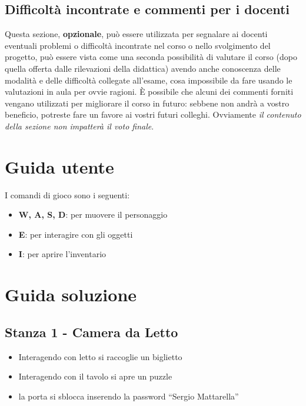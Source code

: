 \documentclass[a4paper,12pt]{report}
\begin{document}
\section{Difficoltà incontrate e commenti per i docenti}

Questa sezione, \textbf{opzionale}, può essere utilizzata per segnalare ai docenti eventuali problemi o difficoltà incontrate nel corso o nello svolgimento del progetto, può essere vista come una seconda possibilità di valutare il corso (dopo quella offerta dalle rilevazioni della didattica) avendo anche conoscenza delle modalità e delle difficoltà collegate all'esame, cosa impossibile da fare usando le valutazioni in aula per ovvie ragioni.
%
È possibile che alcuni dei commenti forniti vengano utilizzati per migliorare il corso in futuro: sebbene non andrà a vostro beneficio, potreste fare un favore ai vostri futuri colleghi.
%
Ovviamente \textit{il contenuto della sezione non impatterà il voto finale}.

\appendix
\chapter{Guida utente}

I comandi di gioco sono i seguenti:
\begin{itemize}
	\item \textbf{W, A, S, D}: per muovere il personaggio
	\item \textbf{E}: per interagire con gli oggetti
	\item \textbf{I}: per aprire l'inventario
\end{itemize}

\chapter{Guida soluzione}
%
\section{Stanza 1 - Camera da Letto}
\begin{itemize}
	\item Interagendo con letto si raccoglie un biglietto 
	\item Interagendo con il tavolo si apre un puzzle 
	\item la porta si sblocca inserendo la password “Sergio Mattarella”
\end{itemize}
%
\end{document}
